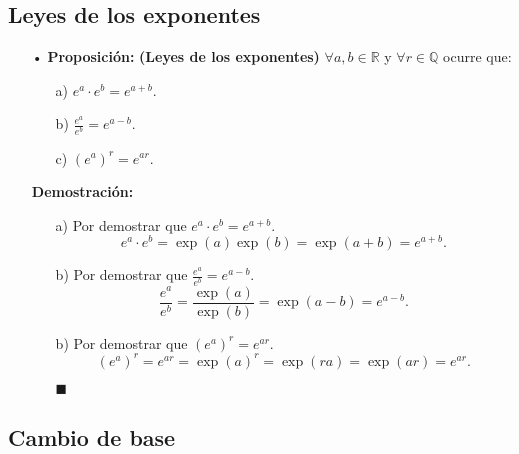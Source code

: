 \documentclass[pts12]{article}
\numberwithin{equation}{section}
\newcommand{\Col}{\color{ProcessBlue}}
\begin{document}
\subsection{\Col Leyes de los exponentes}

\begin{itemize}

\item[\Col •] \textbf{Proposición:} \textbf{(Leyes de los exponentes)} $\forall a,b\in\mathbb{R}$ y $\forall r\in\mathbb{Q}$ ocurre que:
\begin{enumerate}
\item[a)] $e^a\cdot e^b=e^{a+b}$.
\item[b)] $\frac{e^a}{e^b}=e^{a-b}$.
\item[c)] $({e^a})^{r}=e^{ar}$.
\end{enumerate}

\textbf{Demostración:}

\begin{enumerate}
\item[a)] Por demostrar que $e^a\cdot e^b=e^{a+b}$.
$$e^a\cdot e^b=\exp(a)\exp(b)=\exp(a+b)=e^{a+b}.$$
\item[b)] Por demostrar que $\frac{e^a}{e^b}=e^{a-b}$.
$$\frac{e^a}{e^b}=\frac{\exp(a)}{\exp(b)}=\exp(a-b)=e^{a-b}.$$
\item[b)] Por demostrar que $({e^a})^{r}=e^{ar}$.
$$({e^a})^{r}=e^{ar}=\exp(a)^{r}=\exp(ra)=\exp(ar)=e^{ar}.$$

\begin{flushright}
$\blacksquare$
\end{flushright}

\end{enumerate}

\end{itemize}

\subsection{\Col Cambio de base}
\end{document}
